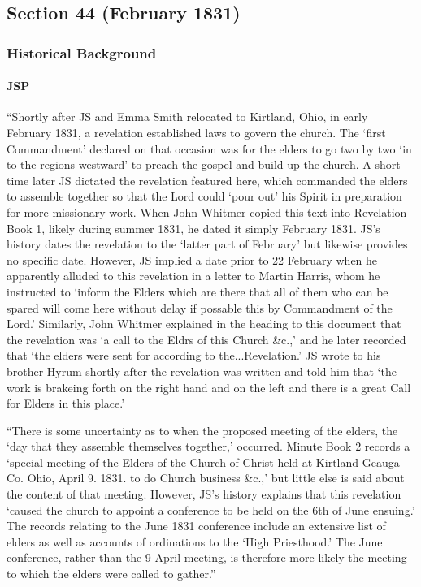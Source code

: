 \subsection{Section 44 (February 1831)}
	\label{DC44}
	
	\subsubsection{Historical Background}
		\label{DC44-HB}
		
		\paragraph{JSP}
		
			``Shortly after JS and Emma Smith relocated to Kirtland, Ohio, in early February 1831, a revelation established laws to govern the church. The `first Commandment' declared on that occasion was for the elders to go two by two `in to the regions westward' to preach the gospel and build up the church. A short time later JS dictated the revelation featured here, which commanded the elders to assemble together so that the Lord could `pour out' his Spirit in preparation for more missionary work. When John Whitmer copied this text into Revelation Book 1, likely during summer 1831, he dated it simply February 1831. JS's history dates the revelation to the `latter part of February' but likewise provides no specific date. However, JS implied a date prior to 22 February when he apparently alluded to this revelation in a letter to Martin Harris, whom he instructed to `inform the Elders which are there that all of them who can be spared will come here without delay if possable this by Commandment of the Lord.' Similarly, John Whitmer explained in the heading to this document that the revelation was `a call to the Eldrs of this Church \&c.,' and he later recorded that `the elders were sent for according to the...Revelation.' JS wrote to his brother Hyrum shortly after the revelation was written and told him that `the work is brakeing forth on the right hand and on the left and there is a great Call for Elders in this place.'
			
			``There is some uncertainty as to when the proposed meeting of the elders, the `day that they assemble themselves together,' occurred. Minute Book 2 records a `special meeting of the Elders of the Church of Christ held at Kirtland Geauga Co. Ohio, April 9. 1831. to do Church business \&c.,' but little else is said about the content of that meeting. However, JS's history explains that this revelation `caused the church to appoint a conference to be held on the 6th of June ensuing.' The records relating to the June 1831 conference include an extensive list of elders as well as accounts of ordinations to the `High Priesthood.' The June conference, rather than the 9 April meeting, is therefore more likely the meeting to which the elders were called to gather.''
		
